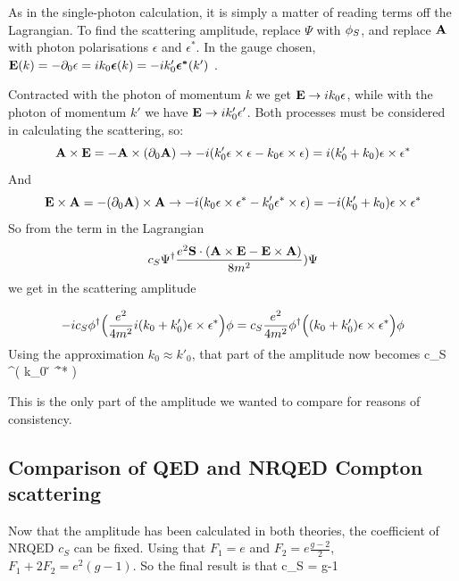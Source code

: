 As in the single-photon calculation, it is simply a matter of reading terms off the Lagrangian.  To find the scattering amplitude,  replace $\Psi$ with $\phi_S$, and replace $\mathbf{A}$ with photon polarisations $\epsilon$ and $\epsilon^*$.  In the gauge chosen, $\mathbf{E}(k) = -\partial_0 \mathbf{\epsilon} = i k_0 \mbox{\boldmath$ \epsilon $}(k) = -ik'_0 \mbox{\boldmath$ \epsilon^* $}(k') $ .

Contracted with the photon of momentum $k$ we get $\mathbf{E} \to i k_0 \mathbf{\epsilon}$, while with the photon of momentum $k'$ we have $\mathbf{E} \to i k'_0 \mathbf{\epsilon'}$.  Both processes must be considered in calculating the scattering, so:
\[
	\mathbf{A} \times \mathbf{E} = - \mathbf{A} \times (\partial_0 \mathbf{A})
		\to 
	-i(k_0' \mathbf{\epsilon} \times \mathbf{\epsilon} - k_0 \mathbf{\epsilon} \times \mathbf{\epsilon} ) = i ( k_0' + k_0) \mathbf{\epsilon} \times \mathbf{\epsilon}^*
\]
And
\[
	\mathbf{E} \times \mathbf{A} = - (\partial_0 \mathbf{A}) \times  \mathbf{A}
		\to 
	-i( k_0 \mathbf{\epsilon} \times \mathbf{\epsilon^*} - k_0' \mathbf{\epsilon^*} \times \mathbf{\epsilon} ) = -i ( k_0' + k_0) \mathbf{\epsilon} \times \mathbf{\epsilon^*}
\]
So from the term in the Lagrangian 
\[
 c_S \Psi^\dagger \frac{ e^2 \mathbf{S} \cdot ( \mathbf{A} \times \mathbf{E} - \mathbf{E} \times \mathbf{A} )}{8m^2} ) \Psi
\]
we get in the scattering amplitude

\[
  -i c_S \phi^\dagger  \Big ( \frac{e^2}{4m^2}    i(k_0 + k_0')    \mathbf{\epsilon} \times \mathbf{\epsilon^*} \Big ) \phi
	=
     c_S \frac{e^2}{4m^2} \phi^\dagger  \Big ( (k_0 + k_0')    \mathbf{\epsilon} \times \mathbf{\epsilon^*} \Big ) \phi
\]
Using the approximation $k_0 \approx k'_0$, that part of the amplitude now becomes
\beq
     c_S  \phi^\dagger  \Big ( k_0    \v{\epsilon} \times \v{\epsilon^*} \Big ) \phi
\eeq


This is the only part of the amplitude we wanted to compare for reasons of consistency.
	

\subsection{Comparison of QED and NRQED Compton scattering}
Now that the amplitude has been calculated in both theories, the coefficient of NRQED $c_S$ can be fixed.  Using that $F_1 = e$ and $F_2 = e\frac{g-2}{2}$, $F_1 + 2F_2 = e^2(g-1)$.
So the final result is that 
\beq
	c_S = g-1
\eeq
 


